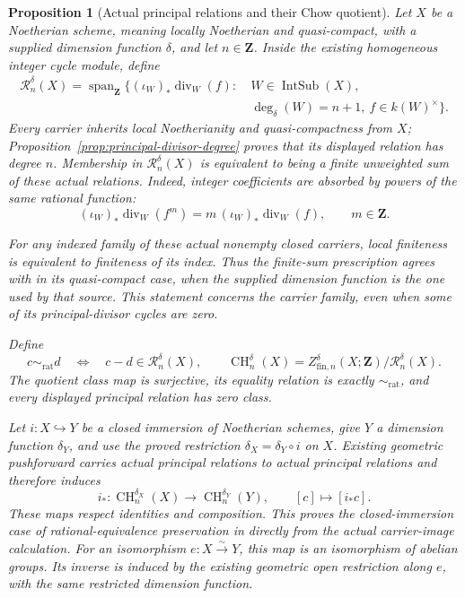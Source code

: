 \documentclass[11pt]{article}
\newtheorem{proposition}[theorem]{Proposition}
\theoremstyle{definition}
\theoremstyle{remark}
\begin{document}
\begin{proposition}[Actual principal relations and their Chow quotient]
\label{prop:principal-relations}
Let \(X\) be a Noetherian scheme, meaning locally Noetherian and
quasi-compact, with a supplied dimension function \(\delta\), and let
\(n\in\mathbf Z\). Inside the existing homogeneous integer cycle module,
define
\[
\begin{aligned}
  \mathcal R_n^\delta(X)
    =\operatorname{span}_{\mathbf Z}\bigl\{
      (\iota_W)_*\operatorname{div}_W(f):\ &W\in\operatorname{IntSub}(X),\\
      &\deg_\delta(W)=n+1,\ f\in k(W)^\times\bigr\}.
\end{aligned}
\]
Every carrier inherits local Noetherianity and quasi-compactness from
\(X\); Proposition~\ref{prop:principal-divisor-degree} proves that its
displayed relation has degree \(n\).
Membership in \(\mathcal R_n^\delta(X)\) is equivalent to being a finite
\emph{unweighted} sum of these actual relations. Indeed, integer
coefficients are absorbed by powers of the same rational function:
\[
  (\iota_W)_*\operatorname{div}_W(f^m)
    =m\,(\iota_W)_*\operatorname{div}_W(f),
  \qquad m\in\mathbf Z.
\]

For any indexed family of these actual nonempty closed carriers, local
finiteness is equivalent to finiteness of its index. Thus the finite-sum
prescription agrees with \cite{StacksRationalEquivalence} in its
quasi-compact case, when the supplied dimension function is the one used
by that source. This statement concerns the carrier family, even when
some of its principal-divisor cycles are zero.

Define
\[
  c\sim_{\mathrm{rat}}d
    \quad\Longleftrightarrow\quad c-d\in\mathcal R_n^\delta(X),
  \qquad
  \operatorname{CH}_n^\delta(X)
    =Z^{\delta}_{\mathrm{fin},n}(X;\mathbf Z)/\mathcal R_n^\delta(X).
\]
The quotient class map is surjective, its equality relation is exactly
\(\sim_{\mathrm{rat}}\), and every displayed principal relation has zero
class.

Let \(i:X\hookrightarrow Y\) be a closed immersion of Noetherian schemes,
give \(Y\) a dimension function \(\delta_Y\), and use the proved
restriction \(\delta_X=\delta_Y\circ i\) on \(X\). Existing geometric
pushforward carries actual principal relations to actual principal
relations and therefore induces
\[
  i_*:\operatorname{CH}_n^{\delta_X}(X)
    \longrightarrow\operatorname{CH}_n^{\delta_Y}(Y),
  \qquad [c]\longmapsto[i_*c].
\]
These maps respect identities and composition. This proves the
closed-immersion case of rational-equivalence preservation in
\cite{StacksRationalEquivalenceProperPushforward} directly from the
actual carrier-image calculation.
For an isomorphism \(e:X\xrightarrow{\sim}Y\), this map is an isomorphism
of abelian groups. Its inverse is induced by the existing geometric
open restriction along \(e\), with the same restricted dimension
function.
\end{proposition}
\end{document}

